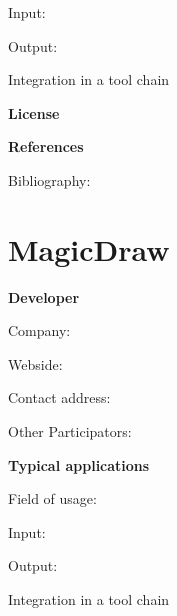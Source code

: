 \documentclass{./template/openetcs_report}
\begin{document}
	Input:

	Output:





	Integration in a tool chain



	\textbf{License}


	\textbf{References}

	Bibliography:


\section{MagicDraw}

	\textbf{Developer}

	Company: 

	Webside:

	Contact address:

	Other  Participators:



	\textbf{Typical applications}

	Field of usage:


	Input:

	Output:





	Integration in a tool chain

\end{document}
